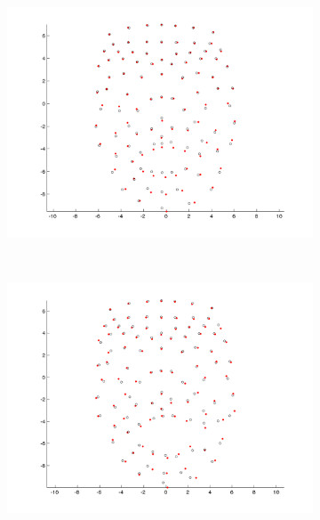 \documentclass[11pt]{report}
\begin{document}
\begin{figure}[htbp!]
        ~ %
        \begin{subfigure}[b]{0.3\textwidth}
                \includegraphics[trim = 10mm 0mm 10mm 0mm,clip,width=\textwidth]{img/weights/3D/19blends/w2_frame600_blends19.png} 
        \end{subfigure} \\
        \begin{subfigure}[b]{0.3\textwidth}
                \includegraphics[trim = 10mm 0mm 10mm 0mm,clip,width=\textwidth]{img/weights/3D/19blends/w3_frame200_blends19.png}
        \end{subfigure}%

\end{figure}
\end{document}
